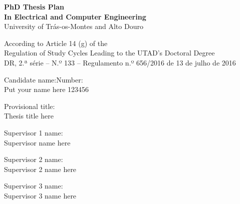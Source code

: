 \documentclass[12pt]{article}
\newcommand\tab[1][1cm]{\hspace*{#1}}
\begin{document}
\doublespacing

\baselineskip 12pt

\vspace*{25mm}

\begin{center}

\textbf{\Large PhD Thesis Plan} \\
\vspace{10mm}
\textbf{In Electrical and Computer Engineering}\\
\vspace{20mm}
{\large University of Trás-os-Montes and Alto Douro}\\
\vspace{20mm}

According to Article 14 (g) of the\\
{\scriptsize Regulation of Study Cycles Leading to the UTAD's Doctoral Degree\\
DR, 2.ª série – N.º 133 – Regulamento n.º 656/2016 de 13 de julho de 2016}\\
\end{center}

\vspace{20mm}

{\scriptsize Candidate name:\tab[7cm]Number:}\\
Put your name here \tab[7cm]123456\\
\vspace{3mm}

{\scriptsize Provisional title:}\\
Thesis title here\\
\vspace{3mm}

{\scriptsize Supervisor 1 name:}\\
Supervisor name here\\
\vspace{3mm}

{\scriptsize Supervisor 2 name:}\\
Supervisor 2 name here\\
\vspace{3mm}

{\scriptsize Supervisor 3 name:}\\
Supervisor 3 name here\\
\vspace{3mm}

\pagebreak
\end{document}
